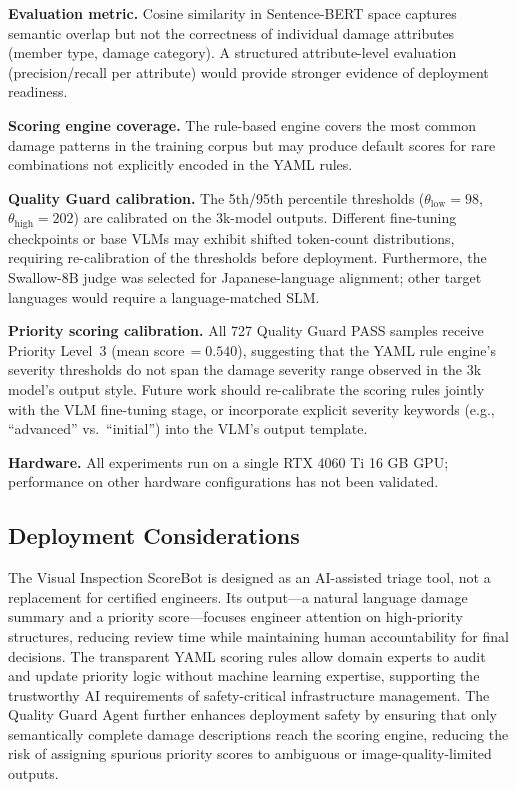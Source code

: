\documentclass[twocolumn]{article}
\begin{document}
\textbf{Evaluation metric.}
Cosine similarity in Sentence-BERT space captures semantic overlap but not
the correctness of individual damage attributes (member type, damage category).
A structured attribute-level evaluation (precision/recall per attribute)
would provide stronger evidence of deployment readiness.

\textbf{Scoring engine coverage.}
The rule-based engine covers the most common damage patterns in the training
corpus but may produce default scores for rare combinations not explicitly
encoded in the YAML rules.

\textbf{Quality Guard calibration.}
The 5th/95th percentile thresholds ($\theta_{\text{low}}=98$,
$\theta_{\text{high}}=202$) are calibrated on the 3k-model outputs.
Different fine-tuning checkpoints or base VLMs may exhibit shifted
token-count distributions, requiring re-calibration of the thresholds
before deployment.
Furthermore, the Swallow-8B judge was selected for Japanese-language
alignment; other target languages would require a language-matched SLM.

\textbf{Priority scoring calibration.}
All 727 Quality Guard PASS samples receive Priority Level~3
(mean score\,$= 0.540$), suggesting that the YAML rule engine's
severity thresholds do not span the damage severity range observed
in the 3k model's output style.
Future work should re-calibrate the scoring rules jointly with the
VLM fine-tuning stage, or incorporate explicit severity keywords
(e.g., ``advanced'' vs.\ ``initial'') into the VLM's output template.

\textbf{Hardware.}
All experiments run on a single RTX 4060 Ti 16 GB GPU;
performance on other hardware configurations has not been validated.

\subsection{Deployment Considerations}

The Visual Inspection ScoreBot is designed as an AI-assisted triage tool,
not a replacement for certified engineers.
Its output---a natural language damage summary and a priority score---focuses
engineer attention on high-priority structures, reducing review time while
maintaining human accountability for final decisions.
The transparent YAML scoring rules allow domain experts to audit and update
priority logic without machine learning expertise, supporting the trustworthy
AI requirements of safety-critical infrastructure management.
The Quality Guard Agent further enhances deployment safety by ensuring that
only semantically complete damage descriptions reach the scoring engine,
reducing the risk of assigning spurious priority scores to ambiguous or
image-quality-limited outputs.
\end{document}
